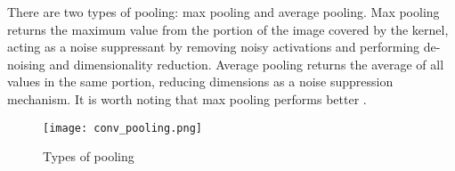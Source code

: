 There are two types of pooling: max pooling and average pooling. Max pooling returns the maximum value from the portion of the image covered by the kernel, acting as a noise suppressant by removing noisy activations and performing de-noising and dimensionality reduction. Average pooling returns the average of all values in the same portion, reducing dimensions as a noise suppression mechanism. It is worth noting that max pooling performs better \cite{compguideCnn}.

\begin{figure}[h]
	\centering
    \texttt{[image: conv\_pooling.png]}
	\caption{Types of pooling \cite{compguideCnn}}
	\label{fig:cnn_pooling}
\end{figure}
